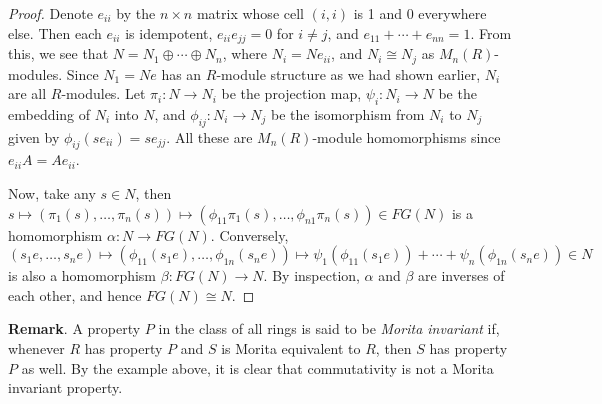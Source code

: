 \documentclass[12pt]{article}
\begin{document}
\begin{proof}
Denote $e_{ii}$ by the $n\times n$ matrix whose cell $(i,i)$ is 1 and $0$ everywhere else.  Then each $e_{ii}$ is idempotent, $e_{ii}e_{jj}=0$ for $i\ne j$, and $e_{11}+\cdots + e_{nn}=1$.  From this, we see that $N=N_1\oplus \cdots \oplus N_n$, where $N_i=Ne_{ii}$, and $N_i\cong N_j$ as $M_n(R)$-modules.  Since $N_1=Ne$ has an $R$-module structure as we had shown earlier, $N_i$ are all $R$-modules.  Let $\pi_i:N\to N_i$ be the projection map, $\psi_i: N_i\to N$ be the embedding of $N_i$ into $N$, and $\phi_{ij}:N_i\to N_j$ be the isomorphism from $N_i$ to $N_j$ given by $\phi_{ij}(se_{ii})=se_{jj}$.  All these are $M_n(R)$-module homomorphisms since $e_{ii}A=Ae_{ii}$.

Now, take any $s\in N$, then $s \mapsto (\pi_1(s),\ldots,\pi_n(s)) \mapsto (\phi_{11}\pi_1(s),\ldots,\phi_{n1}\pi_n(s)) \in FG(N)$ is a homomorphism $\alpha: N\to FG(N)$.  Conversely, $(s_1e,\ldots,s_n e)\mapsto (\phi_{11}(s_1e),\ldots, \phi_{1n}(s_ne)) \mapsto \psi_1(\phi_{11}(s_1e))+\cdots + \psi_n(\phi_{1n}(s_ne)) \in N$ is also a homomorphism $\beta: FG(N)\to N$.  By inspection, $\alpha$ and $\beta$ are inverses of each other, and hence $FG(N)\cong N$.
\end{proof}

\textbf{Remark}.  A property $P$ in the class of all rings is said to be \emph{Morita invariant} if, whenever $R$ has property $P$ and $S$ is Morita equivalent to $R$, then $S$ has property $P$ as well.  By the example above, it is clear that commutativity is not a Morita invariant property.
\end{document}

